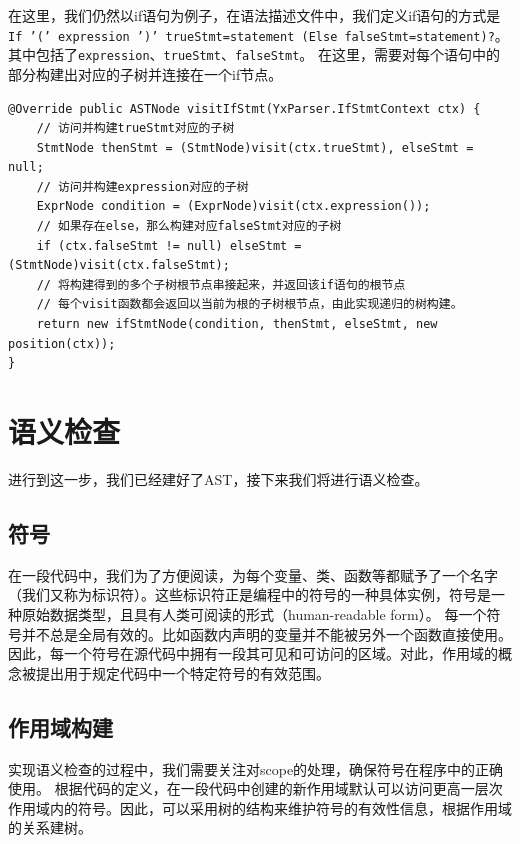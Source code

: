在这里，我们仍然以if语句为例子，在语法描述文件中，我们定义if语句的方式是\texttt{If '(' expression ')' trueStmt=statement (Else falseStmt=statement)?}。
其中包括了\texttt{expression}、\texttt{trueStmt}、\texttt{falseStmt}。
在这里，需要对每个语句中的部分构建出对应的子树并连接在一个if节点。
\begin{lstlisting}
@Override public ASTNode visitIfStmt(YxParser.IfStmtContext ctx) {
    // 访问并构建trueStmt对应的子树
    StmtNode thenStmt = (StmtNode)visit(ctx.trueStmt), elseStmt = null;
    // 访问并构建expression对应的子树
    ExprNode condition = (ExprNode)visit(ctx.expression());
    // 如果存在else，那么构建对应falseStmt对应的子树
    if (ctx.falseStmt != null) elseStmt = (StmtNode)visit(ctx.falseStmt);
    // 将构建得到的多个子树根节点串接起来，并返回该if语句的根节点
    // 每个visit函数都会返回以当前为根的子树根节点，由此实现递归的树构建。
    return new ifStmtNode(condition, thenStmt, elseStmt, new position(ctx));
}
\end{lstlisting}


\section{语义检查}
进行到这一步，我们已经建好了AST，接下来我们将进行语义检查。

\subsection{符号}
在一段代码中，我们为了方便阅读，为每个变量、类、函数等都赋予了一个名字（我们又称为标识符）。这些标识符正是编程中的符号的一种具体实例，符号是一种原始数据类型，且具有人类可阅读的形式（human-readable form）。
每一个符号并不总是全局有效的。比如函数内声明的变量并不能被另外一个函数直接使用。因此，每一个符号在源代码中拥有一段其可见和可访问的区域。对此，作用域的概念被提出用于规定代码中一个特定符号的有效范围。



\subsection{作用域构建}
实现语义检查的过程中，我们需要关注对scope的处理，确保符号在程序中的正确使用。
根据代码的定义，在一段代码中创建的新作用域默认可以访问更高一层次作用域内的符号。因此，可以采用树的结构来维护符号的有效性信息，根据作用域的关系建树。

